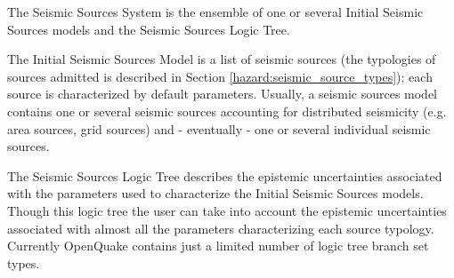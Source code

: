 The Seismic Sources System is the ensemble of one or several 
Initial Seismic Sources models and the Seismic Sources Logic
Tree.

The Initial Seismic Sources Model is a list of seismic sources 
(the typologies of sources admitted is described in Section
\ref{hazard:seismic_source_types}); each source is characterized
by default parameters.
%
Usually, a seismic sources model contains one or several seismic 
sources accounting for distributed seismicity (e.g. area sources, 
grid sources) and - eventually - one or several individual seismic 
sources.

The Seismic Sources Logic Tree describes the epistemic uncertainties 
associated with the parameters used to characterize the Initial 
Seismic Sources models. 
% 
Though this logic tree the user can take into account the epistemic
uncertainties associated with almost all the parameters characterizing
each source typology. 
% 
Currently OpenQuake contains just a limited number of logic tree
branch set types. 

